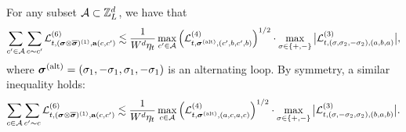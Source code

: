\begin{lemma} \label{ygdhmsgq0}
For any subset $\mathcal A\subset {\mathbb Z}_L^d$, we have that 
\begin{equation}\label{eq_sym_loop_bound}
\sum_{c'\in \mathcal A}\sum_{c\sim c'} \mathcal{L}^{(6)}_{t, ({\boldsymbol{\sigma}}\otimes \overline{{\boldsymbol{\sigma}}})^{(1)}, {\mathbf{a}}(c,c')} \lesssim \frac{1}{W^d\eta_t}\max_{c'\in \mathcal A}\left(\mathcal{L}^{(4)}_{t,{\boldsymbol{\sigma}}^{(\mathrm{alt})}, (c',b,c',b)}\right)^{1/2}\cdot \max_{\sigma\in\{+,-\}} \big|\mathcal{L}^{(3)}_{t, (\sigma,\sigma_2,-\sigma_2), (a,b,a)} \big| ,
\end{equation}
where ${\boldsymbol{\sigma}}^{(\mathrm{alt})}=(\sigma_1,-\sigma_1,\sigma_1,-\sigma_1)$ is an alternating loop. By symmetry, a similar inequality holds: %
\begin{equation}\label{eq_sym_loop_bound2}
 \sum_{c\in \mathcal A}\sum_{c'\sim c}\mathcal{L}^{(6)}_{t, ({\boldsymbol{\sigma}}\otimes \overline{{\boldsymbol{\sigma}}})^{(1)}, {\mathbf{a}}(c,c')} \lesssim \frac{1}{W^d\eta_t}\max_{c\in \mathcal A} \left(\mathcal{L}^{(4)}_{t,{\boldsymbol{\sigma}}^{(\mathrm{alt})}, (a,c,a,c)}\right)^{1/2} \cdot \max_{\sigma\in \{+,-\}}\big|\mathcal{L}^{(3)}_{t, (\sigma, -{\sigma}_2, \sigma_2), (b,a,b)}\big|.
\end{equation}
\end{lemma}
